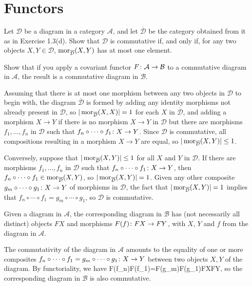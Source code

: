\section{Functors}

\bx
\ben[label=(\alph*)]
\item  Let $\mathcal{D}$ be a diagram in a category $\mathcal{A}$, and let $\overline{\mathcal{D}}$ be the category obtained
from it as in Exercise 1.3(d). Show that $\mathcal{D}$ is commutative if, and only if, for any two objects $X, Y \in \mathcal{D}$, $\operatorname{mor}_{\overline{\mathcal{D}}}(X, Y )$ has at most one element.
\item Show that if you apply a covariant functor $F \colon \mathcal{A} \to \mathcal{B}$ to a commutative diagram in $\mathcal{A}$, the result is a commutative diagram in $\mathcal{B}$.
\een
\ex

\bs
\ben[label=(\alph*)]
\item Assuming that there is at most one morphism between any two objects in $\mathcal{D}$ to begin with, the diagram $\overline{\mathcal{D}}$ is formed by adding any identity morphisms not already present in $\mathcal{D}$, so $|\operatorname{mor}_{\overline{\mathcal{D}}}(X,X)|=1$ for each $X$ in $\overline{\mathcal{D}}$, and adding a morphism $X\to Y$ if there is no morphism $X\to Y$ in $\mathcal{D}$ but there are morphisms $f_1,\ldots,f_n$ in $\mathcal{D}$ such that $f_n\circ\cdots\circ f_1\colon X\to Y$. Since $\mathcal{D}$ is commutative, all compositions resulting in a morphism $X\to Y$ are equal, so $|\operatorname{mor}_{\overline{\mathcal{D}}}(X,Y)|\leq 1$.

Conversely, suppose that $|\operatorname{mor}_{\overline{\mathcal{D}}}(X,Y)|\leq 1$ for all $X$ and $Y$ in $\mathcal{D}$. If there are morphisms $f_1,\ldots,f_n$ in $\mathcal{D}$ such that $f_n\circ\cdots\circ f_1\colon X\to Y$, then $f_n\circ\cdots\circ f_1\in\operatorname{mor}_{\overline{\mathcal{D}}}(X,Y)$, so $|\operatorname{mor}_{\overline{\mathcal{D}}}(X,Y)|=1$. Given any other composite $g_m\circ\cdots\circ g_1\colon X\to Y$ of morphisms in $\mathcal{D}$, the fact that $|\operatorname{mor}_{\overline{\mathcal{D}}}(X,Y)|=1$ implies that $f_n\circ\cdots\circ f_1=g_m\circ\cdots\circ g_1$, so $\mathcal{D}$ is commutative.
\item Given a diagram in $\mathcal{A}$, the corresponding diagram in $\mathcal{B}$ has (not necessarily all distinct) objects $FX$ and morphisms $F(f)\colon FX\to FY$, with $X$, $Y$ and $f$ from the diagram in $\mathcal{A}$.

The commutativity of the diagram in $\mathcal{A}$ amounts to the equality of one or more composites $f_n\circ \cdots \circ f_1=g_m\circ \cdots \circ g_1\colon X\to Y$ between two objects $X,Y$ of the diagram. By functoriality, we have
\bse
F(f_n)\circ \cdots \circ F(f_1)=F(g_m)\circ \cdots \circ F(g_1)\cl FX\to FY,
\ese
so the corresponding diagram in $\mathcal{B}$ is also commutative.

